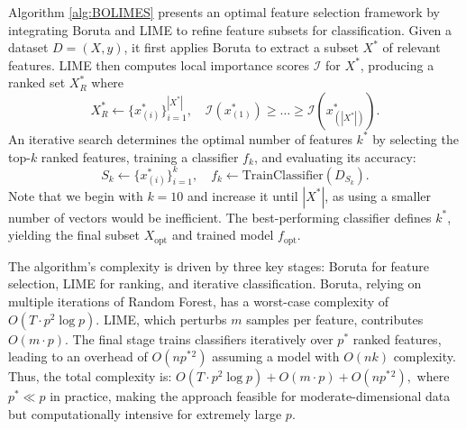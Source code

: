 Algorithm \ref{alg:BOLIMES} presents an optimal feature selection framework by integrating Boruta and LIME to refine feature subsets for classification. Given a dataset \( D = (X, y) \), it first applies Boruta to extract a subset \( X^* \) of relevant features. LIME then computes local importance scores \( \mathcal{I} \) for \( X^* \), producing a ranked set \( X^*_R \) where
\[
X^*_R \gets \{ x^*_{(i)} \}_{i=1}^{|X^*|}, \quad \mathcal{I}(x^*_{(1)}) \geq \dots \geq \mathcal{I}(x^*_{(|X^*|)}).
\]
An iterative search determines the optimal number of features \( k^* \) by selecting the top-\( k \) ranked features, training a classifier \( f_k \), and evaluating its accuracy:
\[
S_k \gets \{ x^*_{(i)} \}_{i=1}^{k}, \quad f_k \leftarrow \text{TrainClassifier}(D_{S_k}).
\]
Note that we begin with 
$k=10$ and increase it until 
$|X^*|$, as using a smaller number of vectors would be inefficient. The best-performing classifier defines \( k^* \), yielding the final subset \( X_{\text{opt}} \) and trained model \( f_{\text{opt}} \). 


The algorithm's complexity is driven by three key stages: Boruta for feature selection, LIME for ranking, and iterative classification. Boruta, relying on multiple iterations of Random Forest, has a worst-case complexity of \( O(T \cdot p^2 \log p) \). LIME, which perturbs \( m \) samples per feature, contributes \( O(m \cdot p) \). The final stage trains classifiers iteratively over \( p^* \) ranked features, leading to an overhead of \( O(n p^*{}^2) \) assuming a model with \( O(n k) \) complexity. Thus, the total complexity is:
\(
O(T \cdot p^2 \log p) + O(m \cdot p) + O(n p^*{}^2),
\)
where \( p^* \ll p \) in practice, making the approach feasible for moderate-dimensional data but computationally intensive for extremely large \( p \).




